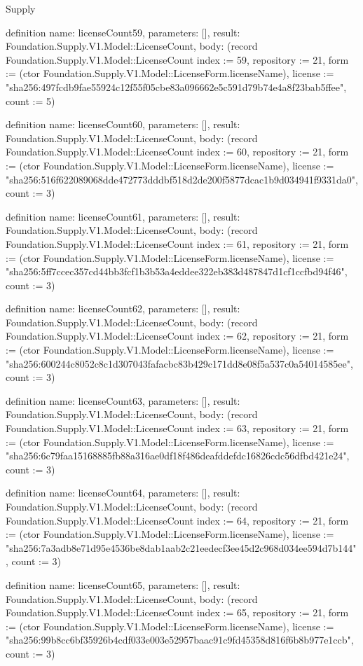 \begin{lexlean}{Supply}
\begin{semanticmodule}
definition{
  name: licenseCount59,
  parameters: [],
  result: Foundation.Supply.V1.Model::LicenseCount,
  body: (record Foundation.Supply.V1.Model::LicenseCount {index := 59, repository := 21, form := (ctor Foundation.Supply.V1.Model::LicenseForm.licenseName), license := "sha256:497fcdb9fae55924c12f55f05cbe83a096662e5c591d79b74e4a8f23bab5ffee", count := 5})
}

definition{
  name: licenseCount60,
  parameters: [],
  result: Foundation.Supply.V1.Model::LicenseCount,
  body: (record Foundation.Supply.V1.Model::LicenseCount {index := 60, repository := 21, form := (ctor Foundation.Supply.V1.Model::LicenseForm.licenseName), license := "sha256:516f622089068dde472773dddbf518d2de200f5877dcac1b9d034941f9331da0", count := 3})
}

definition{
  name: licenseCount61,
  parameters: [],
  result: Foundation.Supply.V1.Model::LicenseCount,
  body: (record Foundation.Supply.V1.Model::LicenseCount {index := 61, repository := 21, form := (ctor Foundation.Supply.V1.Model::LicenseForm.licenseName), license := "sha256:5ff7ccec357cd44bb3fcf1b3b53a4eddee322eb383d487847d1cf1ccfbd94f46", count := 3})
}

definition{
  name: licenseCount62,
  parameters: [],
  result: Foundation.Supply.V1.Model::LicenseCount,
  body: (record Foundation.Supply.V1.Model::LicenseCount {index := 62, repository := 21, form := (ctor Foundation.Supply.V1.Model::LicenseForm.licenseName), license := "sha256:600244c8052c8c1d307043fafacbc83b429c171dd8e08f5a537c0a54014585ee", count := 3})
}

definition{
  name: licenseCount63,
  parameters: [],
  result: Foundation.Supply.V1.Model::LicenseCount,
  body: (record Foundation.Supply.V1.Model::LicenseCount {index := 63, repository := 21, form := (ctor Foundation.Supply.V1.Model::LicenseForm.licenseName), license := "sha256:6c79faa15168885fb88a316ae0df18f486deafddefdc16826cdc56dfbd421e24", count := 3})
}

definition{
  name: licenseCount64,
  parameters: [],
  result: Foundation.Supply.V1.Model::LicenseCount,
  body: (record Foundation.Supply.V1.Model::LicenseCount {index := 64, repository := 21, form := (ctor Foundation.Supply.V1.Model::LicenseForm.licenseName), license := "sha256:7a3adb8e71d95e4536be8dab1aab2c21eedecf3ee45d2c968d034ee594d7b144", count := 3})
}

definition{
  name: licenseCount65,
  parameters: [],
  result: Foundation.Supply.V1.Model::LicenseCount,
  body: (record Foundation.Supply.V1.Model::LicenseCount {index := 65, repository := 21, form := (ctor Foundation.Supply.V1.Model::LicenseForm.licenseName), license := "sha256:99b8cc6bf35926b4cdf033e003e52957baac91c9fd45358d816f6b8b977e1ccb", count := 3})
}


\end{semanticmodule}
\end{lexlean}
